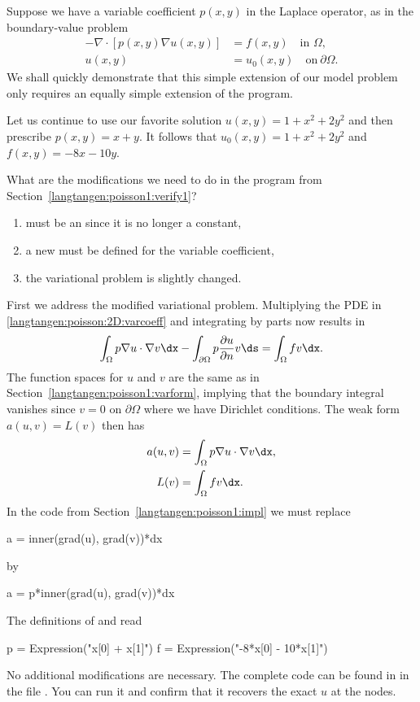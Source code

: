 Suppose we have a variable coefficient $p(x,y)$ in the Laplace operator,
as in the boundary-value problem
\begin{equation} \label{langtangen:poisson:2D:varcoeff}
  \begin{split}
    - \nabla\cdot \left\lbrack
p(x,y)\nabla u(x,y)\right\rbrack &= f(x,y) \quad \mbox{in } \Omega,
    \\
    u(x,y) &= u_0(x,y) \quad \mbox{on}\  \partial\Omega.
  \end{split}
\end{equation}
We shall quickly demonstrate that this simple extension of our model
problem only requires an equally simple extension of the \fenics{} program.

Let us continue to use our favorite solution $u(x,y)=1+x^2+2y^2$ and
then prescribe $p(x,y)=x+y$. It follows that $u_0(x,y) = 1 + x^2 + 2y^2$
and $f(x,y)=-8x-10y$.

What are the modifications we need to do in the 
program from Section~\ref{langtangen:poisson1:verify1}?
\begin{enumerate}
  \item {} must be an  since it is no longer
  a constant,

  \item a new   must be defined for the variable
  coefficient,

  \item the variational problem is slightly changed.
\end{enumerate}
First we address the modified variational problem. Multiplying the PDE
in \eqref{langtangen:poisson:2D:varcoeff} and integrating by parts now
results in
%
\begin{equation}
  \int_\Omega p\nabla u\cdot\nabla v\dx -
  \int_{\partial\Omega} p \frac{\partial u}{\partial n}v\ds = \int_\Omega
  fv\dx.
\end{equation}
%
The function spaces for $u$ and $v$ are the same as in
Section~\ref{langtangen:poisson1:varform}, implying that the boundary
integral vanishes since $v=0$ on $\partial\Omega$ where we have Dirichlet
conditions.  The weak form $a(u,v)=L(v)$ then has
\begin{align}
  a(u,v) &= \int_\Omega p\nabla u\cdot\nabla v\dx,
\\
  L(v) &= \int_\Omega fv\dx.
\end{align}
In the code from Section~\ref{langtangen:poisson1:impl} we must replace
\begin{python}
a = inner(grad(u), grad(v))*dx
\end{python}
by
\begin{python}
a = p*inner(grad(u), grad(v))*dx
\end{python}
The definitions of  and  read
\begin{python}
p = Expression("x[0] + x[1]")
f = Expression("-8*x[0] - 10*x[1]")
\end{python}
No additional modifications are necessary. The complete code can be
found in in the file . You can run it and confirm
that it recovers the exact $u$ at the nodes.

